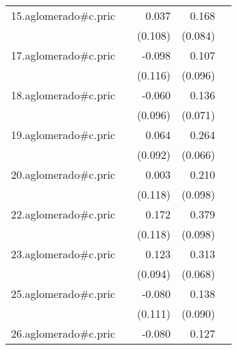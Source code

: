 {\begin{longtable}{l*{4}{D{.}{.}{-1}}}
\addlinespace
15.aglomerado#c.pric&                     &       0.037         &       0.168\sym{*}  &                     \\
            &                     &     (0.108)         &     (0.084)         &                     \\
\addlinespace
17.aglomerado#c.pric&                     &      -0.098         &       0.107         &                     \\
            &                     &     (0.116)         &     (0.096)         &                     \\
\addlinespace
18.aglomerado#c.pric&                     &      -0.060         &       0.136         &                     \\
            &                     &     (0.096)         &     (0.071)         &                     \\
\addlinespace
19.aglomerado#c.pric&                     &       0.064         &       0.264\sym{***}&                     \\
            &                     &     (0.092)         &     (0.066)         &                     \\
\addlinespace
20.aglomerado#c.pric&                     &       0.003         &       0.210\sym{*}  &                     \\
            &                     &     (0.118)         &     (0.098)         &                     \\
\addlinespace
22.aglomerado#c.pric&                     &       0.172         &       0.379\sym{***}&                     \\
            &                     &     (0.118)         &     (0.098)         &                     \\
\addlinespace
23.aglomerado#c.pric&                     &       0.123         &       0.313\sym{***}&                     \\
            &                     &     (0.094)         &     (0.068)         &                     \\
\addlinespace
25.aglomerado#c.pric&                     &      -0.080         &       0.138         &                     \\
            &                     &     (0.111)         &     (0.090)         &                     \\
\addlinespace
26.aglomerado#c.pric&                     &      -0.080         &       0.127         &                     \\

\end{longtable}}
